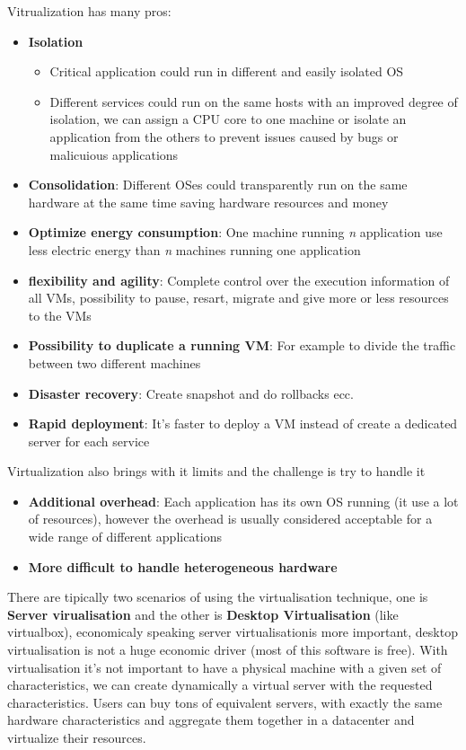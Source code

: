 Vitrualization has many pros:
\begin{itemize}
    \item \textbf{Isolation}
    \begin{itemize}
        \item Critical application could run in different and easily isolated OS
        \item Different services could run on the same hosts with an improved degree of isolation, we can assign a CPU core to one machine or isolate an application from the others to prevent issues caused by bugs or malicuious applications
    \end{itemize}
    \item \textbf{Consolidation}: Different OSes could transparently run on the same hardware at the same time saving hardware resources and money
    \item \textbf{Optimize energy consumption}: One machine running \textit{n} application use less electric energy than \textit{n} machines running one application
    \item \textbf{flexibility and agility}: Complete control over the execution information of all VMs, possibility to pause, resart, migrate and give more or less resources to the VMs
    \item \textbf{Possibility to duplicate a running VM}: For example to divide the traffic between two different machines
    \item \textbf{Disaster recovery}: Create snapshot and do rollbacks ecc.
    \item \textbf{Rapid deployment}: It's faster to deploy a VM instead of create a dedicated server for each service
\end{itemize}
Virtualization also brings with it limits and the challenge is try to handle it
\begin{itemize}
    \item \textbf{Additional overhead}: Each application has its own OS running (it use a lot of resources), however the overhead is usually considered acceptable for a wide range of different applications
    \item \textbf{More difficult to handle heterogeneous hardware}
\end{itemize}
There are tipically two scenarios of using the virtualisation technique, one is \textbf{Server virualisation} and the other is \textbf{Desktop Virtualisation} (like virtualbox), economicaly speaking server virtualisationis more important, desktop virtualisation is not a huge economic driver (most of this software is free). With virtualisation it's not important to have a physical machine with a given set of characteristics, we can create dynamically a virtual server with the requested characteristics. Users can buy tons of equivalent servers, with exactly the same hardware characteristics and aggregate them together in a datacenter and virtualize their resources.

